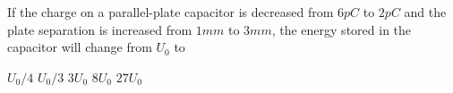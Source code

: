\begin{questions}\setcounter{question}{31}\question
If the charge on a parallel-plate capacitor is decreased from $6 \unit{pC}$ to $2 \unit{pC}$ and the plate separation is increased from $1 \unit{mm}$ to $3 \unit{mm}$, the energy stored in the capacitor will change from $U_{0}$ to

\begin{oneparchoices}
\choice $U_{0} / 4$
\choice $U_{0} / 3$
\choice $3 U_{0}$
\choice $8 U_{0}$
\choice $27 U_{0}$
\end{oneparchoices}\end{questions}

